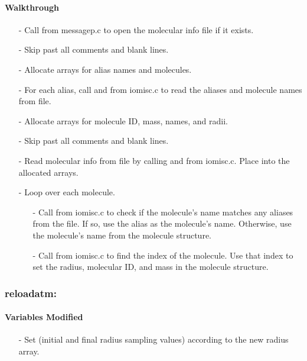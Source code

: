 \documentclass[letterpaper,12pt]{article}
\begin{document}
\paragraph{Walkthrough}
\begin{enumerate}[leftmargin=10pt, noitemsep, parsep=0pt, topsep=0ex]
\item[-] Call  from messagep.c to open the molecular info file if it exists.
\item[-] Skip past all comments and blank lines.
\item[-] Allocate arrays for alias names and molecules.
\item[-] For each alias, call  and  from iomisc.c to read the aliases and molecule names from file.
\item[-] Allocate arrays for molecule ID, mass, names, and radii.
\item[-] Skip past all comments and blank lines.
\item[-] Read molecular info from file by calling  and  from iomisc.c. Place into the allocated arrays.
\item[-] Loop over each molecule.
\begin{enumerate}[leftmargin=10pt, noitemsep, parsep=0pt, topsep=0ex]
\item[-] Call  from iomisc.c to check if the molecule's name matches any aliases from the file. If so, use the alias as the molecule's name. Otherwise, use the molecule's name from the molecule structure.
\item[-] Call  from iomisc.c to find the index of the molecule. Use that index to set the radius, molecular ID, and mass in the molecule structure. 
\end{enumerate}
\end{enumerate} 

\subsubsection{reloadatm:}
\paragraph{Variables Modified}
\begin{enumerate}[leftmargin=10pt, noitemsep, parsep=0pt, topsep=0ex]
\item[-] Set  (initial and final radius sampling values) according to the new radius array.
\end{enumerate}
\end{document}
